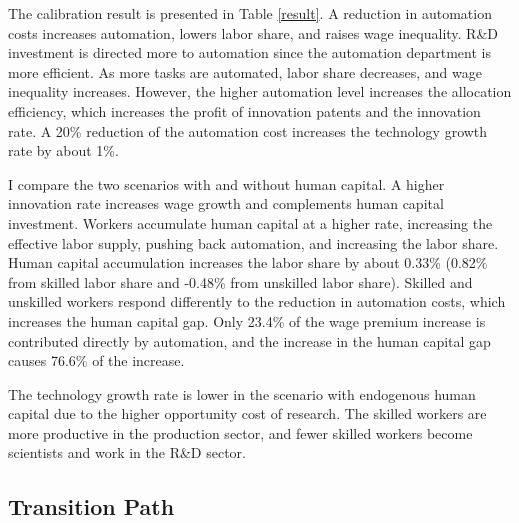 \documentclass[12pt]{article}
\begin{document}
The calibration result is presented in Table \ref{result}. A reduction in automation costs increases automation, lowers labor share, and raises wage inequality. R\&D investment is directed more to automation since the automation department is more efficient. As more tasks are automated, labor share decreases, and wage inequality increases. However, the higher automation level increases the allocation efficiency, which increases the profit of innovation patents and the innovation rate. A 20\% reduction of the automation cost increases the technology growth rate by about 1\%. 

I compare the two scenarios with and without human capital. A higher innovation rate increases wage growth and complements human capital investment. Workers accumulate human capital at a higher rate, increasing the effective labor supply, pushing back automation, and increasing the labor share. Human capital accumulation increases the labor share by about 0.33\% (0.82\% from skilled labor share and -0.48\% from unskilled labor share). Skilled and unskilled workers respond differently to the reduction in automation costs, which increases the human capital gap. Only 23.4\% of the wage premium increase is contributed directly by automation, and the increase in the human capital gap causes 76.6\% of the increase. 

The technology growth rate is lower in the scenario with endogenous human capital due to the higher opportunity cost of research. The skilled workers are more productive in the production sector, and fewer skilled workers become scientists and work in the R\&D sector. 

\subsection{Transition Path}
\end{document}
